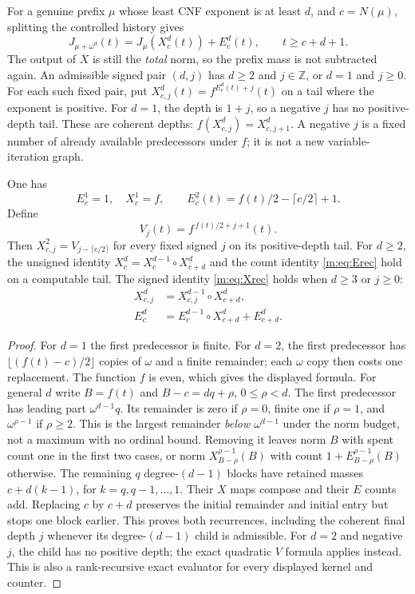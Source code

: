 For a genuine prefix $\mu$ whose least CNF exponent is at least $d$, and
$c=N(\mu)$, splitting the controlled history gives
\begin{equation}\label{m:eq:prefix}
 J_{\mu+\omega^d}(t)=J_\mu(X^d_c(t))+E^d_c(t),
       \qquad t\ge c+d+1.
\end{equation}
The output of $X$ is still the \emph{total} norm, so the prefix mass is not
subtracted again. An admissible signed pair $(d,j)$ has $d\ge2$ and
$j\in\mathbb Z$, or $d=1$ and $j\ge0$. For each such fixed pair, put
$X^d_{c,j}(t)=f^{E^d_c(t)+j}(t)$ on a tail where the exponent is positive.
For $d=1$, the depth is $1+j$, so a negative $j$ has no positive-depth tail.
These are coherent depths: $f(X^d_{c,j})=X^d_{c,j+1}$. A negative $j$ is a
fixed number of already available predecessors under $f$; it is not a new
variable-iteration graph.

\begin{lemma}\label{m:lem:kernel-recursion}
One has
\[
 E^1_c=1,\quad X^1_c=f,\qquad
 E^2_c(t)=f(t)/2-\lceil c/2\rceil+1.
\]
Define
\begin{equation}\label{m:eq:V}
 V_j(t)=f^{\,f(t)/2+j+1}(t).
\end{equation}
Then $X^2_{c,j}=V_{j-\lceil c/2\rceil}$ for every fixed signed $j$ on
its positive-depth tail. For $d\ge2$, the unsigned identity
$X^d_c=X^{d-1}_c\circ X^d_{c+d}$ and the count identity
\eqref{m:eq:Erec} hold on a computable tail. The signed identity
\eqref{m:eq:Xrec} holds when $d\ge3$ or $j\ge0$:
\begin{align}
 X^d_{c,j}&=X^{d-1}_{c,j}\circ X^d_{c+d},\label{m:eq:Xrec}\\
 E^d_c&=E^{d-1}_c\circ X^d_{c+d}+E^d_{c+d}.\label{m:eq:Erec}
\end{align}
\end{lemma}
\begin{proof}
For $d=1$ the first predecessor is finite. For $d=2$, the first
predecessor has $\lfloor(f(t)-c)/2\rfloor$ copies of $\omega$ and a finite
remainder; each $\omega$ copy then costs one replacement. The function $f$
is even, which gives the displayed formula.
For general $d$ write $B=f(t)$ and $B-c=dq+\rho$, $0\le\rho<d$. The first
predecessor has leading part $\omega^{d-1}q$. Its remainder is zero if
$\rho=0$, finite one if $\rho=1$, and $\omega^{\rho-1}$ if $\rho\ge2$.
This is the largest remainder \emph{below $\omega^{d-1}$} under the norm
budget, not a maximum with no ordinal bound. Removing it leaves norm $B$
with spent count one in the first two cases, or norm
$X^{\rho-1}_{B-\rho}(B)$ with count $1+E^{\rho-1}_{B-\rho}(B)$ otherwise.
The remaining $q$ degree-$(d-1)$ blocks have retained masses
$c+d(k-1)$, for $k=q,q-1,\ldots,1$. Their $X$ maps compose and their $E$
counts add. Replacing $c$ by $c+d$ preserves the initial remainder and
initial entry but stops one block earlier. This proves both recurrences,
including the coherent final depth $j$ whenever its degree-$(d-1)$
child is admissible. For $d=2$ and negative $j$, the child has no positive
depth; the exact quadratic $V$ formula applies instead. This is also a
rank-recursive exact evaluator for every displayed kernel and counter.
\end{proof}

